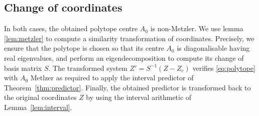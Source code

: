 \documentclass{article}
\begin{document}
\subsection{Change of coordinates}
In both cases, the obtained polytope centre $A_0$ is non-Metzler.
We use lemma \ref{lem:metzler} to compute a similarity transformation of coordinates. Precisely, we ensure that the polytope is chosen so that its centre $A_0$ is diagonalisable having real eigenvalues, and perform an eigendecomposition to compute its change of basis matrix $S$. The transformed system $Z'=S^{-1}(Z-Z_c)$ verifies \eqref{eq:polytope} with $A_0$ Metlzer as required to apply the interval predictor of Theorem~\ref{thm:predictor}. Finally, the obtained predictor is transformed back to the original coordinates $Z$ by using the interval arithmetic of Lemma~\ref{lem:interval}.



\end{document}
